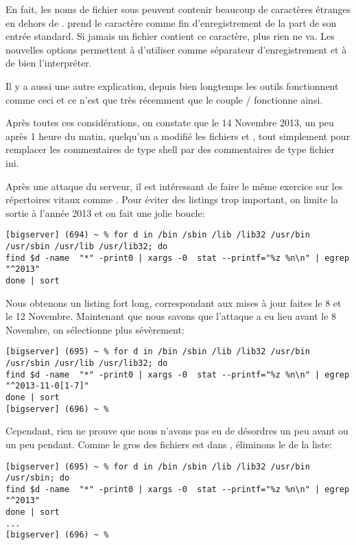 En fait, les noms de fichier sous \unix{} peuvent contenir beaucoup de caractères étranges en dehors de \code{/}.  prend le caractère  comme fin d'enregistrement de la part de son entrée standard. Si jamais un fichier contient ce caractère, plus rien ne va. Les nouvelles options permettent à  d'utiliser  comme séparateur d'enregistrement et à  de bien l'interpréter.

Il y a aussi une autre explication, depuis bien longtemps les outils \GNU{} fonctionnent comme ceci et ce n'est que très récemment que le couple / fonctionne ainsi.

Après toutes ces considérations, on constate que le 14 Novembre 2013, un peu après 1 heure du matin, quelqu'un a modifié les fichiers   et , tout simplement pour remplacer les commentaires de type shell par des commentaires de type fichier ini.

Après une attaque du serveur, il est intéressant de faire le même exercice sur les répertoires vitaux comme . Pour éviter des listings trop important, on limite la sortie à l'année 2013 et on fait une jolie boucle:

\begin{lstlisting}[caption=recherche d'une attaque part I]
[bigserver] (694) ~ % for d in /bin /sbin /lib /lib32 /usr/bin /usr/sbin /usr/lib /usr/lib32; do
find $d -name  "*" -print0 | xargs -0  stat --printf="%z %n\n" | egrep "^2013"
done | sort
\end{lstlisting}

Nous obtenons un listing fort long, correspondant aux mises à jour faites le 8 et le 12 Novembre. Maintenant que nous savons que l'attaque a eu lieu avant le 8 Novembre, on sélectionne plus sévèrement:

\begin{lstlisting}[caption=recherche d'une attaque part II]
[bigserver] (695) ~ % for d in /bin /sbin /lib /lib32 /usr/bin /usr/sbin /usr/lib /usr/lib32; do
find $d -name  "*" -print0 | xargs -0  stat --printf="%z %n\n" | egrep "^2013-11-0[1-7]"
done | sort
[bigserver] (696) ~ %
\end{lstlisting}

Cependant, rien ne prouve que nous n'avons pas eu de désordres un peu avant ou un peu pendant. Comme le gros des fichiers est dans , éliminons le de la liste:

\begin{lstlisting}[caption=recherche d'une attaque part III]
[bigserver] (695) ~ % for d in /bin /sbin /lib /lib32 /usr/bin /usr/sbin; do
find $d -name  "*" -print0 | xargs -0  stat --printf="%z %n\n" | egrep "^2013"
done | sort
...
[bigserver] (696) ~ %
\end{lstlisting}

